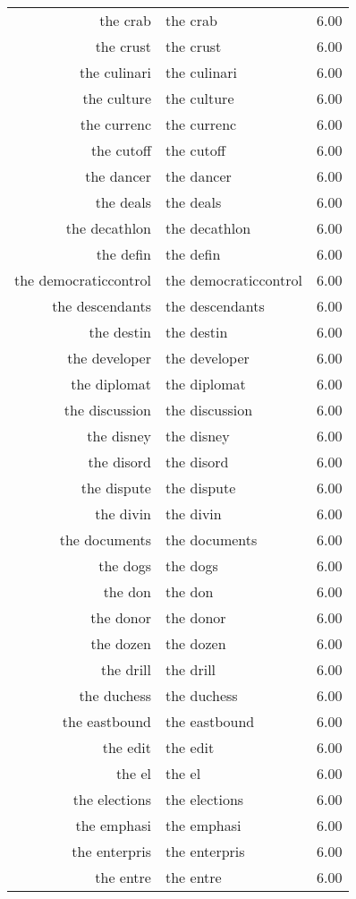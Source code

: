 \begin{table}[ht]
\begin{tabular}{rlr}
  the crab & the crab & 6.00 \\ 
  the crust & the crust & 6.00 \\ 
  the culinari & the culinari & 6.00 \\ 
  the culture & the culture & 6.00 \\ 
  the currenc & the currenc & 6.00 \\ 
  the cutoff & the cutoff & 6.00 \\ 
  the dancer & the dancer & 6.00 \\ 
  the deals & the deals & 6.00 \\ 
  the decathlon & the decathlon & 6.00 \\ 
  the defin & the defin & 6.00 \\ 
  the democraticcontrol & the democraticcontrol & 6.00 \\ 
  the descendants & the descendants & 6.00 \\ 
  the destin & the destin & 6.00 \\ 
  the developer & the developer & 6.00 \\ 
  the diplomat & the diplomat & 6.00 \\ 
  the discussion & the discussion & 6.00 \\ 
  the disney & the disney & 6.00 \\ 
  the disord & the disord & 6.00 \\ 
  the dispute & the dispute & 6.00 \\ 
  the divin & the divin & 6.00 \\ 
  the documents & the documents & 6.00 \\ 
  the dogs & the dogs & 6.00 \\ 
  the don & the don & 6.00 \\ 
  the donor & the donor & 6.00 \\ 
  the dozen & the dozen & 6.00 \\ 
  the drill & the drill & 6.00 \\ 
  the duchess & the duchess & 6.00 \\ 
  the eastbound & the eastbound & 6.00 \\ 
  the edit & the edit & 6.00 \\ 
  the el & the el & 6.00 \\ 
  the elections & the elections & 6.00 \\ 
  the emphasi & the emphasi & 6.00 \\ 
  the enterpris & the enterpris & 6.00 \\ 
  the entre & the entre & 6.00 \\ 

\end{tabular}
\end{table}
